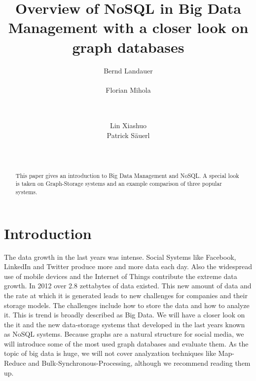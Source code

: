 \documentclass{acm_proc_article-sp}
\begin{document}
\title{Overview of NoSQL in Big Data Management with a closer look on graph databases }

\author{
\alignauthor
Bernd Landauer\\
       \\
\alignauthor 
Florian Mihola\\
	\\
	\\
\and
\alignauthor Lin Xiashuo 
       \\
\alignauthor Patrick S{\"a}uerl\\
       \\
       \\
}


\maketitle
\begin{abstract}
This paper gives an introduction to Big Data Management and NoSQL. A special look is taken on Graph-Storage systems and an example comparison of three popular systems.
\end{abstract}

\section{Introduction}

The data growth in the last years was intense. Social Systems like Facebook, LinkedIn and Twitter produce more and more data each day. Also the widespread use of mobile devices and the Internet of Things contribute the extreme data growth. In 2012 over 2.8 zettabytes of data existed\cite{DBLP:conf/bis/SchmidtMMPH14}. This new amount of data and the rate at which it is generated leads to new challenges for companies and their storage models. The challenges include how to store the data and how to analyze it. This is trend is broadly described as Big Data. We will have a closer look on the it and the new data-storage systems that developed in the last years known as NoSQL systems. Because graphs are a natural structure for social media, we will introduce some of the most used graph databases and evaluate them. As the topic of big data is huge, we will not cover analyzation techniques like Map-Reduce and Bulk-Synchronous-Processing, although we recommend reading them up.
\end{document}
